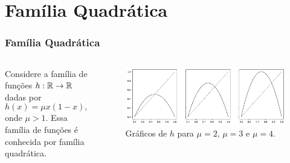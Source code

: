 \section{Família Quadrática}


\begin{frame}
\vspace{5pt}
\frametitle{Família Quadrática}
\begin{columns}
\column{\dimexpr\paperwidth-15pt}

Considere a família de funções $h: \mathbb{R} \to \mathbb{R}$ dadas por
$$h(x) = \mu x(1-x),$$
onde $\mu > 1$.
Essa família de funções é conhecida por família quadrática.

\begin{figure}[!htb]
\centering
\includegraphics[scale=0.4]{images/h_2,3,4,5.png}
\caption{Gráficos de $h$ para $\mu = 2$, $\mu = 3$ e $\mu = 4$.}
\end{figure}

\end{columns}
\end{frame}
